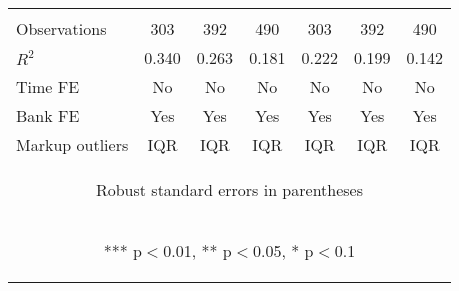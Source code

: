 \documentclass[]{article}
\begin{document}
\begin{center}
\begin{tabular}{lcccccc}
\vspace{4pt} & \begin{footnotesize}\end{footnotesize} & \begin{footnotesize}\end{footnotesize} & \begin{footnotesize}\end{footnotesize} & \begin{footnotesize}\end{footnotesize} & \begin{footnotesize}\end{footnotesize} & \begin{footnotesize}\end{footnotesize} \\
Observations & 303 & 392 & 490 & 303 & 392 & 490 \\
$R^2$ & 0.340 & 0.263 & 0.181 & 0.222 & 0.199 & 0.142 \\
Time FE & No & No & No & No & No & No \\
Bank FE & Yes & Yes & Yes & Yes & Yes & Yes \\
 Markup outliers & IQR & IQR & IQR & IQR & IQR & IQR \\ \hline
\multicolumn{7}{c}{\begin{footnotesize} Robust standard errors in parentheses\end{footnotesize}} \\
\multicolumn{7}{c}{\begin{footnotesize} *** p$<$0.01, ** p$<$0.05, * p$<$0.1\end{footnotesize}} \\
\end{tabular}
\end{center}
\end{document}
